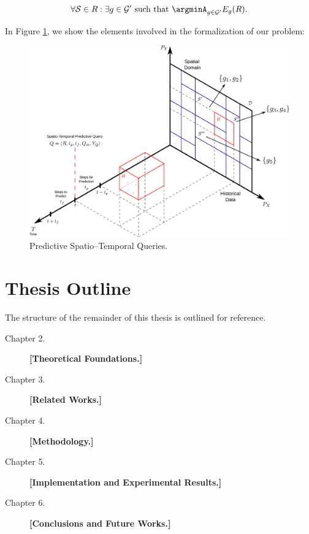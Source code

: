 \begin{equation}
\forall \mathcal{S} \in R: \exists g \in \mathcal{G'} \,\,\textrm{such that} \,\, \argminA_{g\in\mathcal{G'}} E_{g}(R).
\end{equation}

\noindent In Figure \ref{fig:time-series}, we show the elements involved in the formalization of our problem:
\begin{figure}[htb]
	\centering
	\includegraphics[scale=0.25]{../Figures/RepresentationTimeSeries}
	\caption{Predictive Spatio--Temporal Queries.}
	\label{fig:time-series}
\end{figure}


\section{Thesis Outline}
\label{Sec:ThesisOutline}

The structure of the remainder of this thesis is outlined for reference.

\begin{description}
\item[Chapter 2.] \textbf{[Theoretical Foundations.]}
\item[Chapter 3.] \textbf{[Related Works.]}
\item[Chapter 4.] \textbf{[Methodology.]} 
\item[Chapter 5.] \textbf{[Implementation and Experimental Results.]}
\item[Chapter 6.] \textbf{[Conclusions and Future Works.]}
\end{description}

